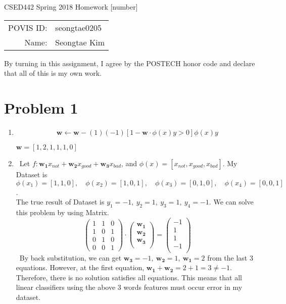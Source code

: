 \documentclass[12pt]{article}
\begin{document}
\begin{center}
{\Large CSED442 Spring 2018 Homework [number]}

\begin{tabular}{rl}
POVIS ID: & seongtae0205 \\
Name: & Seongtae Kim \\
\end{tabular}
\end{center}

By turning in this assignment, I agree by the POSTECH honor code and declare that all of this is my own work.

\section*{Problem 1}

\begin{enumerate}[label=(\alph*)]
  \item
  \begin{equation}
  \mathbf{w}\leftarrow\mathbf{w}-(1)(-1)[1-\mathbf{w}\cdot\phi(x)y>0]\phi(x)y
\end{equation}
\begin{center}
$\mathbf{w}=[1,2,1,1,1,0]$
\end{center}
  \item \ Let $f: \mathbf{w_1}x_{not}+\mathbf{w_2}x_{good}+\mathbf{w_3}x_{bad}$, and $\phi(x)=[x_{not}, x_{good}, x_{bad}]$. My Dataset is $\phi(x_1)=[1, 1, 0], \quad\phi(x_2)=[1, 0, 1], \quad\phi(x_3)=[0, 1, 0], \quad\phi(x_4)=[0, 0, 1]$.\\
    The true result of Dataset is $y_1=-1,\ y_2=1,\ y_3=1,\ y_4=-1$. We can solve this problem by using Matrix.
  \[\begin{pmatrix}
    1&1&0\\
    1&0&1\\
    0&1&0\\
    0&0&1
  \end{pmatrix}\cdot
  \begin{pmatrix}
    \mathbf{w_1}\\
    \mathbf{w_2}\\
    \mathbf{w_3}\\
  \end{pmatrix}
  =
  \begin{pmatrix}
    -1\\
    1\\
    1\\
    -1\\
  \end{pmatrix}
  \]
\ By back substitution, we can get $\mathbf{w_3}=-1,\ \mathbf{w_2}=1,\ \mathbf{w_1}=2$ from the last 3 equations. However, at the first equation, $\mathbf{w_1}+\mathbf{w_2}=2+1=3\neq-1$.
Therefore, there is no solution satisfies all equations. This means that all linear classifiers using the above 3 words features must occur error in my dataset.\\\\


\end{enumerate}
\end{document}
